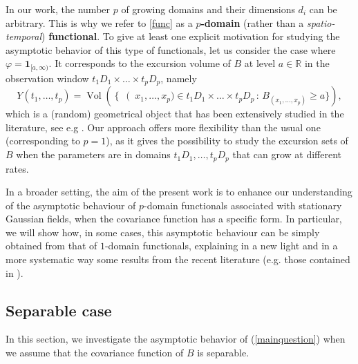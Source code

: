 \documentclass[12pt]{article}
\DeclareMathOperator{\1}{1}
\DeclareMathOperator{\vol}{Vol}
\newcommand{\R}{\mathbb{R}}
\theoremstyle{plain}
\theoremstyle{definition}
\begin{document}
In our work, the number $p$ of growing domains and their dimensions $d_i$ can be arbitrary. This is why we refer to \eqref{func} as a \textbf{$p$-domain} (rather than a {\it spatio-temporal}) {\bf functional}. To give at least one explicit motivation for studying the asymptotic behavior of this type of functionals, let us consider the case where $\varphi=\mathbf{1}_{[a,\infty)}$. It corresponds to the excursion volume of $B$ at level $a\in\R$ in the observation window $t_1D_1\times\dots \times t_pD_p$, namely
\[
Y(t_1,\dots,t_p)=\vol\left(\left\{\right(x_1,\dots,x_{p})\in t_1D_1\times\ldots\times t_pD_p\,:\,B_{(x_1,\dots,x_{p})}\ge a\}\right),
\]
which is a (random) geometrical object that has been extensively studied in the literature, see e.g \cite{MR2319516, LRM23}. 
Our approach offers more flexibility than the usual one (corresponding to $p=1$), as it gives the possibility to study the excursion sets of $B$ when the parameters are in domains $t_1D_1,\ldots,t_pD_p$ that can grow at different rates.

In a broader setting, the aim of the present work is to enhance our understanding of the asymptotic behaviour of $p$-domain functionals associated with stationary Gaussian fields, when the covariance function has a specific form. In particular, we will show how, in some cases, this asymptotic behaviour can be simply obtained from that of $1$-domain functionals, explaining in a new light and in a more systematic way some results from the recent literature (e.g. those contained in \cite{RST}). 

\subsection{Separable case}
\label{subsec:mainres}
In this section, we investigate the asymptotic behavior of (\ref{mainquestion}) when we assume that the covariance function of $B$ is separable.
\end{document}
